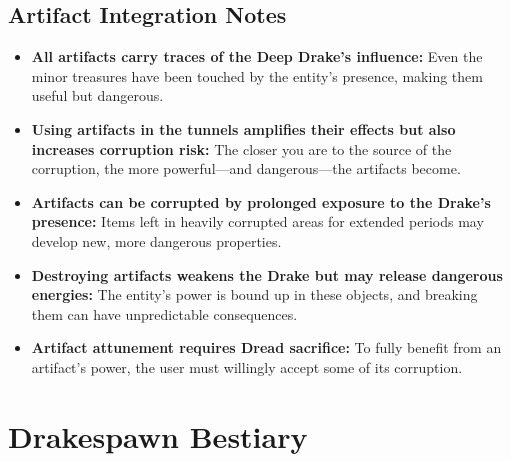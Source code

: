 \documentclass[11pt]{article}
\begin{document}
\subsection{Artifact Integration Notes}
\begin{itemize}
\item \textbf{All artifacts carry traces of the Deep Drake's influence:} Even the minor treasures have been touched by the entity's presence, making them useful but dangerous.
\item \textbf{Using artifacts in the tunnels amplifies their effects but also increases corruption risk:} The closer you are to the source of the corruption, the more powerful—and dangerous—the artifacts become.
\item \textbf{Artifacts can be corrupted by prolonged exposure to the Drake's presence:} Items left in heavily corrupted areas for extended periods may develop new, more dangerous properties.
\item \textbf{Destroying artifacts weakens the Drake but may release dangerous energies:} The entity's power is bound up in these objects, and breaking them can have unpredictable consequences.
\item \textbf{Artifact attunement requires Dread sacrifice:} To fully benefit from an artifact's power, the user must willingly accept some of its corruption.
\end{itemize}

\section{Drakespawn Bestiary}
\end{document}
